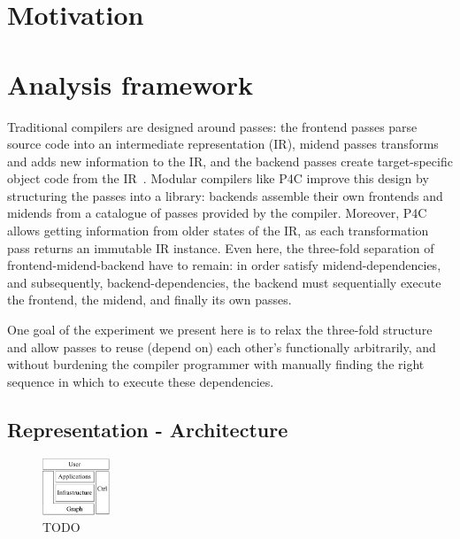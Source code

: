 \documentclass[sigconf]{acmart}
\begin{document}
	\section{Motivation}
	


\clearpage

	\section{Analysis framework}


Traditional compilers are designed around passes: the frontend passes parse source code into an intermediate representation (IR), midend passes transforms and adds new information to the IR, and the backend passes create target-specific object code from the IR~\cite{trad-compilers}.  
Modular compilers like P4C improve this design by structuring the passes into a library: backends assemble their own frontends and midends from a catalogue of passes provided by the compiler. Moreover, P4C allows getting information from older states of the IR, as each transformation pass returns an immutable IR instance.
Even here, the three-fold separation of frontend-midend-backend have to remain: in order satisfy midend-dependencies, and subsequently, backend-dependencies, the backend must sequentially execute the frontend, the midend, and finally its own passes. 

One goal of the experiment we present here is to relax the three-fold structure and allow passes to reuse (depend on) each other's functionally arbitrarily, and without burdening the compiler programmer with manually finding the right sequence in which to execute these dependencies.

\subsection{Representation - Architecture}\label{sec:rep} %


  \begin{figure}
    \includegraphics[width=0.18\textwidth]{figures/arch-top.pdf}
    \caption{TODO}\label{fig:arch-top}
  \end{figure}
\end{document}
